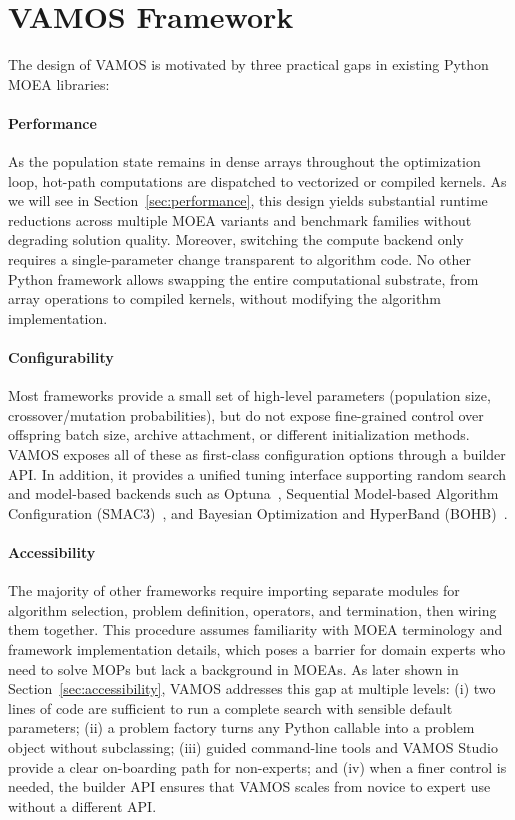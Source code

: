 \documentclass[journal]{IEEEtran}
\begin{document}
\section{VAMOS Framework} \label{sec:framework}

The design of VAMOS is motivated by three practical gaps in existing Python MOEA libraries: 

\paragraph{Performance} As the population state remains in dense arrays throughout the optimization loop, hot-path computations are dispatched to vectorized or compiled kernels. As we will see in Section~\ref{sec:performance}, this design yields substantial runtime reductions across multiple MOEA variants and benchmark families without degrading solution quality. Moreover, switching the compute backend only requires a single-parameter change transparent to algorithm code. No other Python framework allows swapping the entire computational substrate, from array operations to compiled kernels, without modifying the algorithm implementation.

\paragraph{Configurability} Most frameworks provide a small set of high-level parameters (population size, crossover/mutation probabilities), but do not expose fine-grained control over offspring batch size, archive attachment, or different initialization methods. VAMOS exposes all of these as first-class configuration options through a builder API. In addition, it provides a unified tuning interface supporting random search and model-based backends such as Optuna~\cite{ASY+19}, Sequential Model-based Algorithm Configuration (SMAC3)~\cite{LEF+22}, and Bayesian Optimization and HyperBand (BOHB)~\cite{FKH18}.

\paragraph{Accessibility} The majority of other frameworks require importing separate modules for algorithm selection, problem definition, operators, and termination, then wiring them together. This procedure assumes familiarity with MOEA terminology and framework implementation details, which poses a barrier for domain experts who need to solve MOPs but lack a background in MOEAs. As later shown in Section~\ref{sec:accessibility}, VAMOS addresses this gap at multiple levels: (i) two lines of code are sufficient to run a complete search with sensible default parameters; (ii) a problem factory turns any Python callable into a problem object without subclassing; (iii) guided command-line tools and VAMOS Studio provide a clear on-boarding path for non-experts; and (iv) when a finer control is needed, the builder API ensures that VAMOS scales from novice to expert use without a different API.
\end{document}
